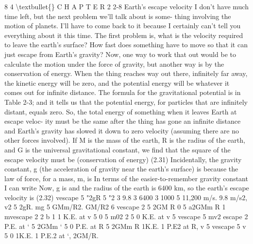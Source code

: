 \documentclass[10pt,oneside]{article}
\begin{document}
8 4 \textbackslash{}textbullet\{\} C H A P T E R  2 2-8 Earth’s escape velocity I don’t have much time left, but the next problem we’ll talk about is some- thing involving the motion of planets. I’ll have to come back to it because I certainly can’t tell you everything about it this time. The first problem is, what is the velocity required to leave the earth’s surface? How fast does something have to move so that it can just escape from Earth’s gravity? Now, one way to work that out would be to calculate the motion under the force of gravity, but another way is by the conservation of energy. When the thing reaches way out there, infinitely far away, the kinetic energy will be zero, and the potential energy will be whatever it comes out for infinite distance. The formula for the gravitational potential is in Table 2-3; and it tells us that the potential energy, for particles that are infinitely distant, equals zero. So, the total energy of something when it leaves Earth at escape veloc- ity must be the same after the thing has gone an infinite distance and Earth’s gravity has slowed it down to zero velocity (assuming there are no other forces involved). If M is the mass of the earth, R is the radius of the earth, and G is the universal gravitational constant, we find that the square of the escape velocity must be (conservation of energy) (2.31) Incidentally, the gravity constant, g (the acceleration of gravity near the earth’s surface) is because the law of force, for a mass, m, is In terms of the easier-to-remember gravity constant I can write Now, g is and the radius of the earth is 6400 km, so the earth’s escape velocity is (2.32) vescape 5 "2gR 5 "2 3 9.8 3 6400 3 1000 5 11,200 m/s. 9.8 m/s2, v2 5 2gR. mg 5 GMm/R2. GM/R2 6 vescape 2 5 2GM R 0 5    a2GMm R 1 mvescape 2 2 b 1                  1 K.E. at v 5 0 5   m02 2   5 0   K.E. at v 5 vescape  5 mv2 escape 2 P.E. at ` 5 2GMm ` 5 0   P.E. at R 5 2GMm R 1K.E. 1 P.E2 at R, v 5 vescape 5 v 5 0 1K.E. 1 P.E.2 at `, 2GM/R.\par
\end{document}
